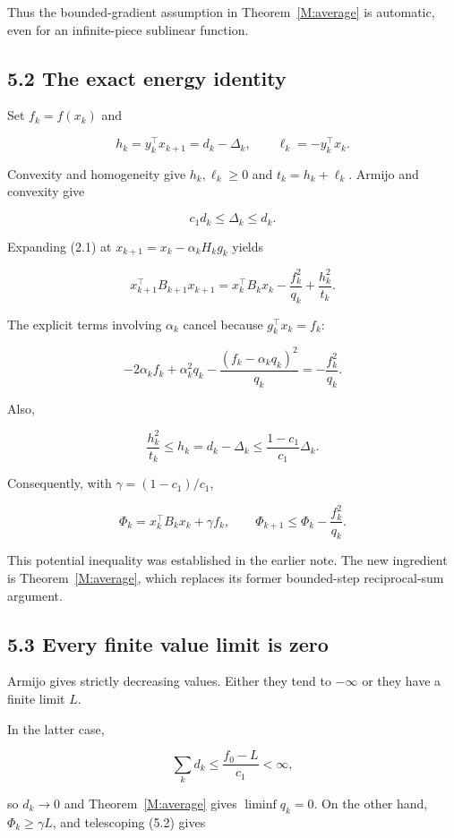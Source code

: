 \documentclass[10pt,oneside,openany]{book}
\theoremstyle{remark}\newtheorem{remark}{Remark}[chapter]
\begin{document}
Thus the bounded-gradient assumption in Theorem~\ref{M:average} is automatic, even for
an infinite-piece sublinear function.

\subsection{5.2 The exact energy
identity}\label{H:the-exact-energy-identity}

Set \(f_k=f(x_k)\) and

\[
h_k=y_k^\top x_{k+1}=d_k-\Delta_k,\qquad
\ell_k=-y_k^\top x_k.
\]

Convexity and homogeneity give \(h_k,\ell_k\ge0\) and
\(t_k=h_k+\ell_k\). Armijo and convexity give

\[
c_1d_k\le\Delta_k\le d_k.
\]

Expanding (2.1) at \(x_{k+1}=x_k-\alpha_kH_kg_k\) yields

\[
\boxed{
x_{k+1}^\top B_{k+1}x_{k+1}
=x_k^\top B_kx_k-\frac{f_k^2}{q_k}+\frac{h_k^2}{t_k}.
}
\tag{H.5.1}
\]

The explicit terms involving \(\alpha_k\) cancel because
\(g_k^\top x_k=f_k\):

\[
-2\alpha_k f_k+\alpha_k^2q_k
-\frac{(f_k-\alpha_kq_k)^2}{q_k}
=-\frac{f_k^2}{q_k}.
\]

Also,

\[
\frac{h_k^2}{t_k}\le h_k=d_k-\Delta_k
\le\frac{1-c_1}{c_1}\Delta_k.
\]

Consequently, with \(\gamma=(1-c_1)/c_1\),

\[
\Phi_k=x_k^\top B_kx_k+\gamma f_k,
\qquad
\boxed{\Phi_{k+1}\le\Phi_k-\frac{f_k^2}{q_k}.}
\tag{H.5.2}
\]

This potential inequality was established in the earlier note. The new
ingredient is Theorem~\ref{M:average}, which replaces its former bounded-step
reciprocal-sum argument.

\subsection{5.3 Every finite value limit is
zero}\label{H:every-finite-value-limit-is-zero}

Armijo gives strictly decreasing values. Either they tend to \(-\infty\)
or they have a finite limit \(L\).

In the latter case,

\[
\sum_k d_k\le\frac{f_0-L}{c_1}<\infty,
\]

so \(d_k\to0\) and Theorem~\ref{M:average} gives \(\liminf q_k=0\). On the other hand,
\(\Phi_k\ge\gamma L\), and telescoping (5.2) gives
\end{document}
